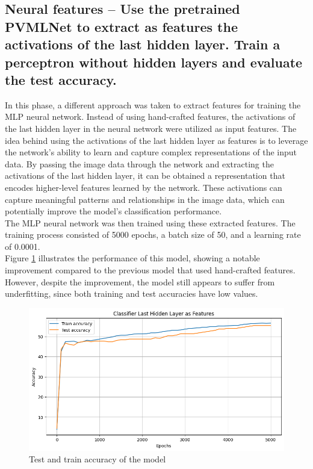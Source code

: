 \documentclass{class}
\begin{document}
\subsection{Neural features -- Use the pretrained PVMLNet to extract as features the activations of the last hidden
    layer. Train a perceptron without hidden layers and evaluate the test accuracy.}
In this phase, a different approach was taken to extract features for training the MLP neural network.
Instead of using hand-crafted features, the activations of the last hidden layer in the neural network were utilized as input features.
The idea behind using the activations of the last hidden layer as features is to leverage the network's ability to learn
and capture complex representations of the input data.
By passing the image data through the network and extracting the activations of the last hidden layer,
it can be obtained a representation that encodes higher-level features learned by the network.
These activations can capture meaningful patterns and relationships in the image data, which can potentially improve the model's classification performance.\\
The MLP neural network was then trained using these extracted features.
The training process consisted of 5000 epochs, a batch size of 50, and a learning rate of 0.0001.\\
Figure \ref{fig-2} illustrates the performance of this model, showing a notable improvement compared
to the previous model that used hand-crafted features.
However, despite the improvement, the model still appears to suffer from underfitting, since both training and test accuracies have low values.
\begin{figure}[h]
    \centering
    \includegraphics[width=.8\columnwidth]{images/1.2_last_hidden_layer.png}
    \caption{Test and train accuracy of the model}
    \label{fig-2}
\end{figure}

\pagestyle{OtherPage}
\end{document}
